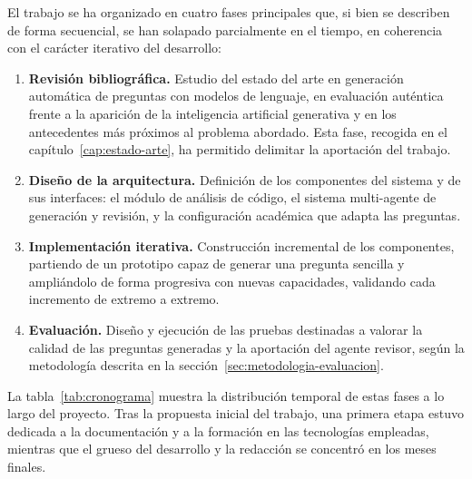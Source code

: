 El trabajo se ha organizado en cuatro fases principales que, si bien se
describen de forma secuencial, se han solapado parcialmente en el
tiempo, en coherencia con el carácter iterativo del desarrollo:

\begin{enumerate}
  \item \textbf{Revisión bibliográfica.} Estudio del estado del arte en
        generación automática de preguntas con modelos de lenguaje, en
        evaluación auténtica frente a la aparición de la inteligencia
        artificial generativa y en los antecedentes más próximos al
        problema abordado. Esta fase, recogida en el
        capítulo~\ref{cap:estado-arte}, ha permitido delimitar la
        aportación del trabajo.
  \item \textbf{Diseño de la arquitectura.} Definición de los
        componentes del sistema y de sus interfaces: el módulo de
        análisis de código, el sistema multi-agente de generación y
        revisión, y la configuración académica que adapta las preguntas.
  \item \textbf{Implementación iterativa.} Construcción incremental de
        los componentes, partiendo de un prototipo capaz de generar una
        pregunta sencilla y ampliándolo de forma progresiva con nuevas
        capacidades, validando cada incremento de extremo a extremo.
  \item \textbf{Evaluación.} Diseño y ejecución de las pruebas
        destinadas a valorar la calidad de las preguntas generadas y la
        aportación del agente revisor, según la metodología descrita en
        la sección~\ref{sec:metodologia-evaluacion}.
\end{enumerate}

La tabla~\ref{tab:cronograma} muestra la distribución temporal de estas
fases a lo largo del proyecto. Tras la propuesta inicial del trabajo, una
primera etapa estuvo dedicada a la documentación y a la formación en las
tecnologías empleadas, mientras que el grueso del desarrollo y la
redacción se concentró en los meses finales.

